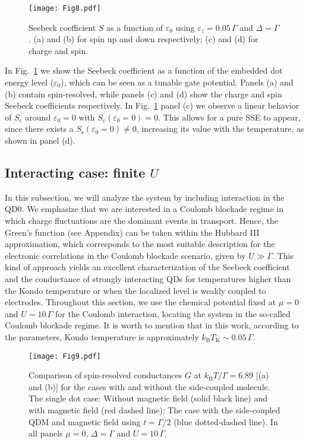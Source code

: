 \documentclass[aps,twocolumn,prb,superscript,floatfix,superscriptaddress,showpacs]{revtex4-1}
\newcommand{\ve}{\varepsilon}
\begin{document}
\begin{figure}[tbph]
\centering
\texttt{[image: Fig8.pdf]}
\caption{Seebeck coefficient $S$ as a function of $\ve_{0}$ using $\ve_{z}=0.05\,\Gamma$ and $\Delta=\Gamma$. (a) and (b) for spin up and down respectively; (c) and (d) for charge and spin.}
\label{Fig8}
\end{figure}

In Fig.\ \ref{Fig8} we show the Seebeck coefficient as a function of the embedded dot energy level ($\ve_{0}$), which can be seen as a tunable gate potential. Panels (a) and (b) contain spin-resolved, while panels (c) and (d) show the charge and spin Seebeck coefficients respectively. In Fig.\ \ref{Fig8} panel (c) we observe a linear behavior of $S_{\text{c}}$ around $\ve_{0}=0$ with $S_{\text{c}}(\ve_{0}=0)=0$. This allows for a pure SSE to appear, since there exists a $S_{\text{s}}(\ve_0=0)\neq 0$, increasing its value with the temperature, as shown in panel (d).


\subsection{Interacting case: finite $U$}

In this subsection, we will analyze the system by including interaction in the QD0. We emphasize that we are interested in a Coulomb blockade regime in which charge fluctuations are the dominant events in transport. Hence, the Green's function (see Appendix) can be taken within the Hubbard III approximation, which corresponds to the most suitable description for the electronic correlations in the Coulomb blockade scenario, given by $U\gg\Gamma$. \cite{Hubbard401,wir2009,rejec2012} This kind of approach yields an excellent characterization of the Seebeck coefficient and the conductance of strongly interacting QDs for temperatures higher than the Kondo temperature\cite{Haldane1978} or when the localized level is weakly coupled to electrodes.\cite{isern2016} Throughout this section, we use the chemical potential fixed at $\mu=0$ and $U=10\,\Gamma$ for the Coulomb interaction, locating the system in the so-called Coulomb blockade regime. It is worth to mention that in this work, according to the parameters, Kondo temperature is approximately $k_{\text{B}}T_{\text{K}}\sim 0.05\,\Gamma$.

\begin{figure}[tbph]
\centering
\texttt{[image: Fig9.pdf]}
\caption{Comparison of spin-resolved conductances $G$ at $k_{\text{B}}T/\Gamma=6.89$ [(a) and (b)] for the cases with and without the side-coupled molecule. The single dot case: Without magnetic field (solid black line) and with magnetic field (red dashed line); The case with the side-coupled QDM and magnetic field using $t=\Gamma/2$ (blue dotted-dashed line). In all panels $\mu=0$, $\Delta=\Gamma$ and $U=10\,\Gamma$.}
\label{Fig9}
\end{figure}
\end{document}
